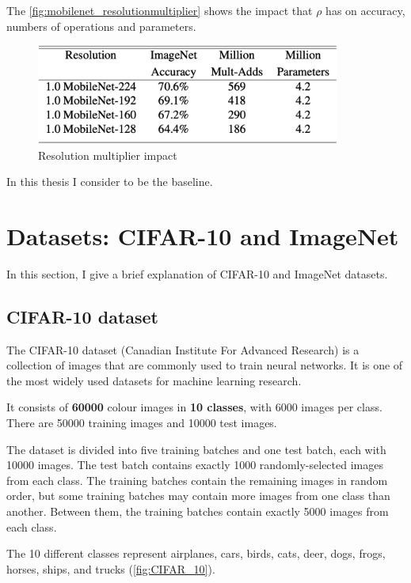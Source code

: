 The \autoref{fig:mobilenet_resolutionmultiplier} shows the impact that $\rho$
has on accuracy, numbers of operations and parameters.

\begin{figure}[ht]
    \includegraphics[width=10cm]{images/results/mobilenet_resolutionmultiplier.png}
    \centering
    \caption{Resolution multiplier impact}\label{fig:mobilenet_resolutionmultiplier}
\end{figure}

In this thesis I consider  to be the baseline.

\section{Datasets: CIFAR-10 and ImageNet}
In this section, I give a brief explanation of CIFAR-10 and ImageNet datasets.

\subsection{CIFAR-10 dataset}
The CIFAR-10 dataset (Canadian Institute For Advanced Research) is a collection
of images that are commonly used to train neural networks. It is one of the
most widely used datasets for machine learning research.

It consists of \textbf{60000}  colour images in
\textbf{10 classes}, with 6000 images per class. There are 50000 training
images and 10000 test images.

The dataset is divided into five training batches and one test batch, each with
10000 images. The test batch contains exactly 1000 randomly-selected images
from each class. The training batches contain the remaining images in random
order, but some training batches may contain more images from one class than
another. Between them, the training batches contain exactly 5000 images from
each class.

The 10 different classes represent airplanes, cars, birds, cats, deer, dogs,
frogs, horses, ships, and trucks (\autoref{fig:CIFAR_10}).

